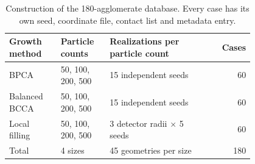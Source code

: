 \begin{table}[htbp]
\centering\small
\caption{Construction of the 180-agglomerate database. Every case has its own seed, coordinate file, contact list and metadata entry.}\label{tab:database}
\begin{tabular}{@{}p{0.21\linewidth}p{0.20\linewidth}p{0.39\linewidth}r@{}}\toprule
Growth method & Particle counts & Realizations per particle count & Cases\\\midrule
BPCA & 50, 100, 200, 500 & 15 independent seeds & 60\\
Balanced BCCA & 50, 100, 200, 500 & 15 independent seeds & 60\\
Local filling & 50, 100, 200, 500 & 3 detector radii $\times$ 5 seeds & 60\\\midrule
Total & 4 sizes & 45 geometries per size & 180\\\bottomrule
\end{tabular}
\end{table}
